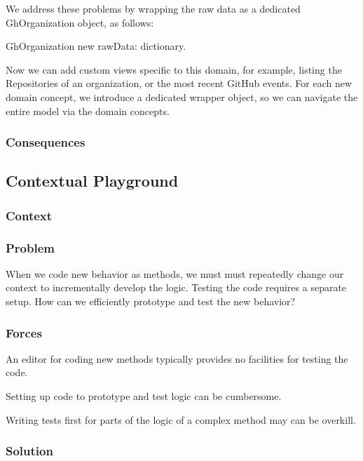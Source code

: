 \documentclass[sigconf]{acmart}
\begin{document}
We address these problems by wrapping the raw data as a dedicated GhOrganization object, as follows:

GhOrganization new rawData: dictionary.
  
Now we can add custom views specific to this domain, for example, listing the Repositories of an organization, or the most recent GitHub events. For each new domain concept, we introduce a dedicated wrapper object, so we can navigate the entire model via the domain concepts.



\subsubsection*{Consequences}


\subsection*{Contextual Playground}\label{pat:contextualPlayground}
\subsubsection*{Context}
\subsubsection*{Problem}

When we code new behavior as methods, we must must repeatedly change our context to incrementally develop the logic. Testing the code requires a separate setup. How can we efficiently prototype and test the new behavior?

\subsubsection*{Forces}

An editor for coding new methods typically provides no facilities for testing the code.

Setting up code to prototype and test logic can be cumbersome.

Writing tests first for parts of the logic of a complex method may can be overkill.


\subsubsection*{Solution}
\end{document}
